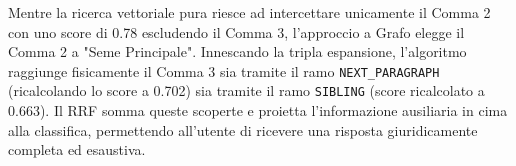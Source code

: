 Mentre la ricerca vettoriale pura riesce ad intercettare unicamente il Comma 2 con uno score di 0.78 escludendo il Comma 3, l'approccio a Grafo elegge il Comma 2 a "Seme Principale". Innescando la tripla espansione, l'algoritmo raggiunge fisicamente il Comma 3 sia tramite il ramo \texttt{NEXT\_PARAGRAPH} (ricalcolando lo score a 0.702) sia tramite il ramo \texttt{SIBLING} (score ricalcolato a 0.663). Il RRF somma queste scoperte e proietta l'informazione ausiliaria in cima alla classifica, permettendo all'utente di ricevere una risposta giuridicamente completa ed esaustiva.